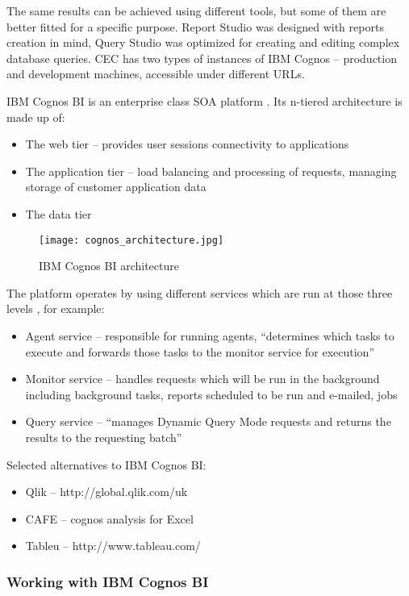 The same results can be achieved using different tools, but some of them are better fitted for a specific purpose. Report Studio was designed with reports creation in mind, Query Studio was optimized for creating and editing complex database queries. CEC has two types of instances of IBM Cognos – production and development machines, accessible under different URLs.

IBM Cognos BI is an enterprise class SOA platform \citep{browne2010ibm}. Its n-tiered architecture is made up of:
\begin{itemize}
\item The web tier – provides user sessions connectivity to applications
\item The application tier – load balancing and processing of requests, managing storage of customer application data
\item The data tier
\end{itemize}

\begin{figure}
\centering
     \texttt{[image: cognos\_architecture.jpg]}
      \caption{IBM Cognos BI architecture \citep{browne2010ibm}}
       \label{normal_case}
\end{figure}

The platform operates by using different services which are run at those three levels \citep{browne2010ibm}, for example:
\begin{itemize}
\item Agent service – responsible for running agents, “determines which tasks to execute and forwards those tasks to the monitor service for execution”
\item Monitor service – handles requests which will be run in the background including background tasks, reports scheduled to be run and e-mailed, jobs
\item Query service – “manages Dynamic Query Mode requests and returns the results to the requesting batch”
\end{itemize}
			
Selected alternatives to IBM Cognos BI:
\begin{itemize}
\item Qlik – http://global.qlik.com/uk
\item CAFE – cognos analysis for Excel
\item Tableu – http://www.tableau.com/
\end{itemize}			
			
			\subsubsection{Working with IBM Cognos BI}
			
